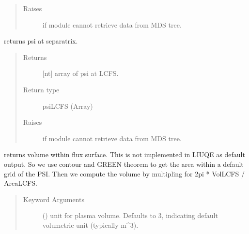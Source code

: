 \documentclass[letterpaper,10pt,english]{sphinxmanual}
\begin{document}
\begin{fulllineitems}
\begin{fulllineitems}
\begin{quote}
\begin{description}
\item[{Raises}] \leavevmode
{} \textendash{} if module cannot retrieve data from MDS tree.

\end{description}\end{quote}

\end{fulllineitems}


\begin{fulllineitems}
\label{\detokenize{eqtools:eqtools.TCVLIUQE.TCVLIUQETree.getFluxLCFS}}
returns psi at separatrix.
\begin{quote}\begin{description}
\item[{Returns}] \leavevmode
{[}nt{]} array of psi at LCFS.

\item[{Return type}] \leavevmode
psiLCFS (Array)

\item[{Raises}] \leavevmode
{} \textendash{} if module cannot retrieve data from MDS tree.

\end{description}\end{quote}

\end{fulllineitems}


\begin{fulllineitems}
\label{\detokenize{eqtools:eqtools.TCVLIUQE.TCVLIUQETree.getFluxVol}}
returns volume within flux surface. This is not implemented in LIUQE
as default output. So we use contour and GREEN theorem to get the area
within a default grid of the PSI. Then we compute the volume by multipling
for 2pi * VolLCFS / AreaLCFS.
\begin{quote}\begin{description}
\item[{Keyword Arguments}] \leavevmode
{} () \textendash{} unit for plasma volume.  Defaults to 3,
indicating default volumetric unit (typically m\textasciicircum{}3).


\end{description}
\end{quote}
\end{fulllineitems}
\end{fulllineitems}
\end{document}
